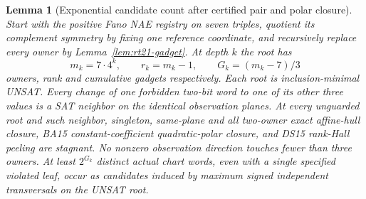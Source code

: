 \documentclass[11pt]{article}
\newtheorem{lemma}[theorem]{Lemma}
\begin{document}
\begin{lemma}[Exponential candidate count after certified pair and polar closure]\label{lem:rt21-candidates}
Start with the positive Fano NAE registry on seven triples, quotient its complement symmetry by fixing one reference coordinate, and recursively replace \emph{every} owner by Lemma~\ref{lem:rt21-gadget}. At depth $k$ the root has
\[
 m_k=7\cdot4^k,\qquad r_k=m_k-1,\qquad
 G_k=(m_k-7)/3
\]
owners, rank and cumulative gadgets respectively. Each root is inclusion-minimal UNSAT. Every change of one forbidden two-bit word to one of its other three values is a SAT neighbor on the identical observation planes. At every unguarded root and such neighbor, singleton, same-plane and all two-owner exact affine-hull closure, BA15 constant-coefficient quadratic-polar closure, and DS15 rank-Hall peeling are stagnant. No nonzero observation direction touches fewer than three owners. At least $2^{G_k}$ distinct actual chart words, even with a single specified violated leaf, occur as candidates induced by maximum signed independent transversals on the UNSAT root.
\end{lemma}
\end{document}
